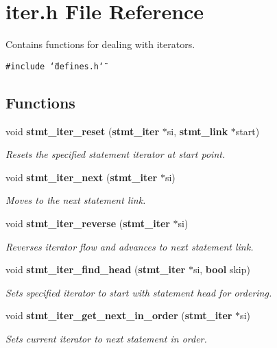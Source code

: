 \section{iter.h File Reference}
\label{iter_8h}
Contains functions for dealing with iterators.  


{\tt \#include \char`\"{}defines.h\char`\"{}}\par
\subsection*{Functions}
\begin{CompactItemize}
\item 
void {\bf stmt\_\-iter\_\-reset} ({\bf stmt\_\-iter} $\ast$si, {\bf stmt\_\-link} $\ast$start)
\begin{CompactList}\small\item\em Resets the specified statement iterator at start point. \item\end{CompactList}\item 
void {\bf stmt\_\-iter\_\-next} ({\bf stmt\_\-iter} $\ast$si)
\begin{CompactList}\small\item\em Moves to the next statement link. \item\end{CompactList}\item 
void {\bf stmt\_\-iter\_\-reverse} ({\bf stmt\_\-iter} $\ast$si)
\begin{CompactList}\small\item\em Reverses iterator flow and advances to next statement link. \item\end{CompactList}\item 
void {\bf stmt\_\-iter\_\-find\_\-head} ({\bf stmt\_\-iter} $\ast$si, {\bf bool} skip)
\begin{CompactList}\small\item\em Sets specified iterator to start with statement head for ordering. \item\end{CompactList}\item 
void {\bf stmt\_\-iter\_\-get\_\-next\_\-in\_\-order} ({\bf stmt\_\-iter} $\ast$si)
\begin{CompactList}\small\item\em Sets current iterator to next statement in order. \item\end{CompactList}\end{CompactItemize}


